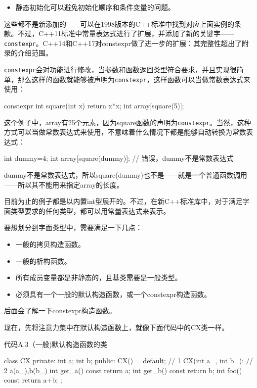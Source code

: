 \begin{itemize}
\item 静态初始化可以避免初始化顺序和条件变量的问题。
\end{itemize}

这些都不是新添加的——可以在1998版本的C++标准中找到对应上面实例的条款。不过，C++11标准中常量表达式进行了扩展，并添加了新的关键字——\texttt{constexpr}。C++14和C++17对constexpr做了进一步的扩展：其完整性超出了附录的介绍范围。

\texttt{constexpr}会对功能进行修改，当参数和函数返回类型符合要求，并且实现很简单，那么这样的函数就能够被声明为\texttt{constexpr}，这样函数可以当做常数表达式来使用：

\begin{cpp}
constexpr int square(int x)
{
  return x*x;
}
int array[square(5)];
\end{cpp}

这个例子中，array有25个元素，因为square函数的声明为\texttt{constexpr}。当然，这种方式可以当做常数表达式来使用，不意味着什么情况下都是能够自动转换为常数表达式：

\begin{cpp}
int dummy=4;
int array[square(dummy)];  // 错误，dummy不是常数表达式
\end{cpp}

dummy不是常数表达式，所以square(dummy)也不是——就是一个普通函数调用——所以其不能用来指定array的长度。


目前为止的例子都是以内置int型展开的。不过，在新C++标准库中，对于满足字面类型要求的任何类型，都可以用常量表达式来表示。

要想划分到字面类型中，需要满足一下几点：

\begin{itemize}
\item 一般的拷贝构造函数。
\item 一般的析构函数。
\item 所有成员变量都是非静态的，且基类需要是一般类型。
\item 必须具有一个一般的默认构造函数，或一个constexpr构造函数。
\end{itemize}

后面会了解一下constexpr构造函数。

现在，先将注意力集中在默认构造函数上，就像下面代码中的CX类一样。

代码A.3（一般)默认构造函数的类

\begin{cpp}
class CX
{
private:
  int a;
  int b;
public:
  CX() = default;  // 1
  CX(int a_, int b_):  // 2
    a(a_),b(b_)
  {}
  int get_a() const
  {
    return a;
  }
  int get_b() const
  {
    return b;
  }
  int foo() const
  {
    return a+b;
  }
};
\end{cpp}

